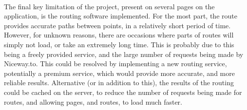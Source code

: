 \ \\
The final key limitation of the project, present on several pages on the application, is the routing software implemented. For the most part, the route provides accurate paths between points, in a relatively short period of time. However, for unknown reasons, there are occasions where parts of routes will simply not load, or take an extremely long time. This is probably due to this being a freely provided service, and the large number of requests being made by Niceway.to. This could be resolved by implementing a new routing service, potentially a premium service, which would provide more accurate, and more reliable results. Alternative (or in addition to this), the results of the routing could be cached on the server, to reduce the number of requests being made for routes, and allowing pages, and routes, to load much faster.


